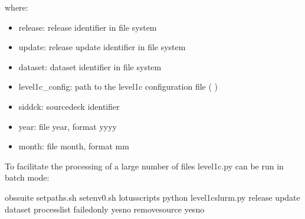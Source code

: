 \documentclass[letterpaper,10pt,english]{sphinxmanual}
\begin{document}
where:
\begin{itemize}
\item {} 
release: release identifier in file system

\item {} 
update: release update identifier in file system

\item {} 
dataset: dataset identifier in file system

\item {} 
level1c\_config: path to the level1c configuration file ( {\hyperref[\detokenize{index:level1c-config-file}]{}})

\item {} 
sid\sphinxhyphen{}dck: source\sphinxhyphen{}deck identifier

\item {} 
year: file year, format yyyy

\item {} 
month: file month, format mm

\end{itemize}

To facilitate the processing of a large number of files level1c.py can be run
in batch mode:

\begin{sphinxVerbatim}[commandchars=\\\{\}]
 obs\PYGZhy{}suite
 setpaths.sh
 setenv0.sh
 lotus\PYGZus{}scripts
python level1c\PYGZus{}slurm.py release update dataset  process\PYGZus{}list \PYGZhy{}\PYGZhy{}failed\PYGZus{}only yesno \PYGZhy{}\PYGZhy{}remove\PYGZus{}source yesno
\end{sphinxVerbatim}
\end{document}
